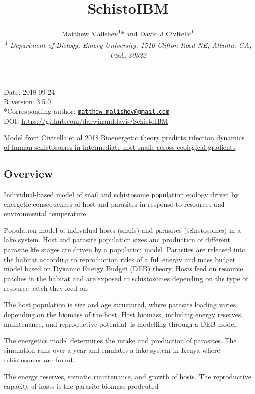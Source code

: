 \documentclass[10,portrait]{article}
\title{SchistoIBM}
\author{Matthew Malishev\textsuperscript{1}* and David J
Civitello\textsuperscript{1}\\[2\baselineskip]\emph{\textsuperscript{1}
Department of Biology, Emory University, 1510 Clifton Road NE, Atlanta,
GA, USA, 30322}}
\date{}
\let\oldsubparagraph\subparagraph
\renewcommand{\subparagraph}[1]{\oldsubparagraph{#1}\mbox{}}
\begin{document}
\maketitle

{
\hypersetup{linkcolor=black}
\setcounter{tocdepth}{4}
\tableofcontents
}
\subparagraph{}\label{section}

Date: 2018-09-24\\
R version: 3.5.0\\
*Corresponding author:
\href{mailto:matthew.malishev@gmail.com}{\nolinkurl{matthew.malishev@gmail.com}}\\
DOI: \url{https://github.com/darwinanddavis/SchistoIBM}

Model from
\href{https://onlinelibrary.wiley.com/doi/abs/10.1111/ele.12937}{Civitello
et al 2018 Bioenergetic theory predicts infection dynamics of human
schistosomes in intermediate host snails across ecological gradients}

\newpage  

\subsection{Overview}\label{overview}

Individual-based model of snail and schistosome population ecology
driven by energetic consequences of host and parasites in response to
resources and environmental temperature.

Population model of individual hosts (snails) and parasites
(schistosomes) in a lake system. Host and parasite population sizes and
production of different parasite life stages are driven by a population
model. Parasites are released into the habitat according to reproduction
rules of a full energy and mass budget model based on Dynamic Energy
Budget (DEB) theory. Hosts feed on resource patches in the habitat and
are exposed to schistosomes depending on the type of resource patch they
feed on.

The host population is size and age structured, where parasite loading
varies depending on the biomass of the host. Host biomass, including
energy reserves, maintenance, and reproductive potential, is modelling
through a DEB model.

The energetics model determines the intake and production of parasites.
The simulation runs over a year and emulates a lake system in Kenya
where schistosomes are found.

The energy reserves, somatic maintenance, and growth of hosts. The
reproductive capacity of hosts is the parasite biomass prodcuted.
\end{document}
